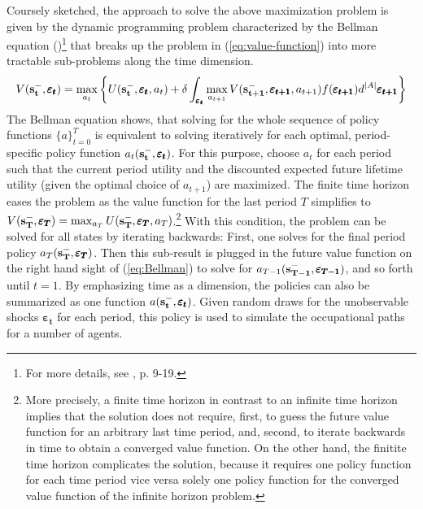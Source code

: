 \documentclass[a4paper,12pt]{article}
\begin{document}
Coursely sketched, the approach to solve the above maximization problem is given by the dynamic programming problem characterized by the Bellman equation (\cite{Bellman.1957})\footnote{For more details, see \cite{Raabe.2019}, p. 9-19.} that breaks up the problem in (\ref{eq:value-function}) into more tractable sub-problems along the time dimension.
\begin{align} \label{eq:Bellman}
V(\bold{s_t^-}, \pmb{\varepsilon_t}) = \max_{a_t} \bigg\{ U(\bold{s_t^-}, \pmb{\varepsilon_t}, a_t) + \delta \int_{\pmb{\varepsilon_t}} \max_{a_{t+1}} V(\bold{s_{t+1}^{-}},\pmb{\varepsilon_{t+1}},a_{t+1}) f(\pmb{\varepsilon_{t+1}})d^{|A|}\pmb{\varepsilon_{t+1}}\bigg\}
\end{align}
\noindent
The Bellman equation shows, that solving for the whole sequence of policy functions ${\{a\}_{t=0}^T}$ is equivalent to solving iteratively for each optimal, period-specific policy function $a_t(\bold{s_t^-}, \pmb{\varepsilon_t})$. For this purpose, choose $a_t$ for each period such that the current period utility and the discounted expected future lifetime utility (given the optimal choice of $a_{t+1}$) are maximized. The finite time horizon eases the problem as the value function for the last period $T$ simplifies to $V(\bold{s_T^-}, \pmb{\varepsilon_T}) = \max_{a_T} U(\bold{s_T^-}, \pmb{\varepsilon_T}, a_T)$.\footnote{More precisely, a finite time horizon in contrast to an infinite time horizon implies that the solution does not require, first, to  guess the future value function for an arbitrary last time period, and, second, to iterate backwards in time to obtain a converged value function. On the other hand, the finitite time horizon complicates the solution, because it requires one policy function for each time period vice versa solely one policy function for the converged value function of the infinite horizon problem.} With this condition, the problem can be solved for all states by iterating backwards: First, one solves for the final period policy $a_T(\bold{s_T^-}, \pmb{\varepsilon_T})$. Then this sub-result is plugged in the future value function on the right hand sight of (\ref{eq:Bellman}) to solve for $a_{T-1}(\bold{s_{T-1}^-}, \pmb{\varepsilon_{T-1}})$, and so forth until $t=1$. By emphasizing time as a dimension, the policies can also be summarized as one function $a(\bold{s_t^-}, \pmb{\varepsilon_t})$. Given random draws for the  unobservable shocks $\pmb{\varepsilon_t}$ for each period, this policy is used to simulate the occupational paths for a number of agents.\\
\end{document}
